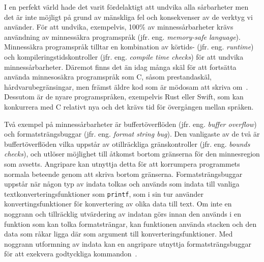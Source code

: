 I en perfekt värld hade det varit fördelaktigt att undvika alla sårbarheter men
det är inte möjligt på grund av mänskliga fel och konsekvenser av de verktyg vi
använder. För att undvika, exempelvis, 100\% av minnessårbarheter krävs
användning av minnessäkra programspråk (jfr. eng. \emph{memory-safe language}).
Minnessäkra programspråk tilltar en kombination av körtids- (jfr. eng.
\emph{runtime}) och kompileringstidskontroller (jfr. eng. \emph{compile
    time checks}) för att undvika minnessårbarheter. Däremot finns det än idag
många skäl för att fortsätta använda minnesosäkra programspråk som C, såsom
prestandaskäl, hårdvarubegränsingar, men främst äldre kod som är mödosam att
skriva om~\cite{computer_security_cs161}. Dessutom är de nyare programspråken,
exempelvis Rust eller Swift, som kan konkurrera med C relativt nya och det
krävs tid för övergången mellan språken.

Två exempel på minnessårbarheter är buffertöverflöden (jfr. eng. \emph{buffer
    overflow}) och formatsträngsbuggar (jfr. eng. \emph{format string bug}). Den
vanligaste av de två är buffertöverflöden vilka uppstår av otillräckliga
gränskontroller (jfr. eng. \emph{bounds checks}), och utlöser möjlighet till åtkomst bortom
gränserna för den minnesregion som avsetts. Angripare kan utnyttja detta för att korrumpera programmets
normala beteende genom att skriva bortom gränserna. Formatsträngsbuggar uppstår
när någon typ av indata tolkas och används som indata till vanliga
textkonverteringsfunktioner som \texttt{printf}, som i sin tur använder
konvertingsfunktioner för konvertering av olika data till text. Om inte en
noggrann och tillräcklig utvärdering av indatan görs innan den används i en
funktion som kan tolka formatsträngar, kan funktionen använda stacken och den
data som råkar ligga där som argument till konverteringsfunktioner. Med noggrann
utformning av indata kan en angripare utnyttja formatsträngsbuggar för att
exekvera godtyckliga kommandon~\cite{computer_security_cs161}.




